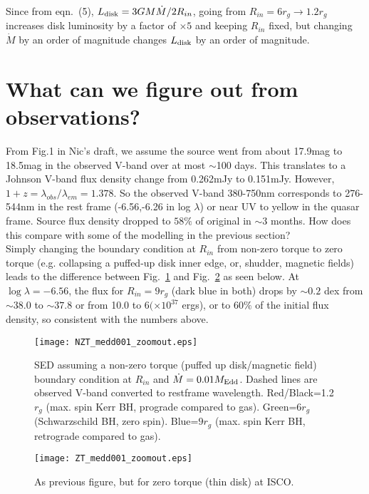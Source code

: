 \documentclass[12pt]{article}
\begin{document}
Since from eqn.~(5), $L_{\rm disk}=3GM\dot{M}/2R_{in}$, going from $R_{in}=6r_{g} \rightarrow 1.2r_{g}$ increases disk luminosity by a factor of $\times 5$ and keeping $R_{in}$ fixed, but changing  $\dot{M}$ by an order of magnitude changes $L_{\rm disk}$ by an order of magnitude.\\

\section{What can we figure out from observations?}
From Fig.1 in Nic's draft, we assume the source went from about 17.9mag to 18.5mag in the observed V-band over at most $\sim $100 days. This translates to a Johnson V-band flux density change from 0.262mJy to 0.151mJy. However, $1+z=\lambda_{obs}/\lambda_{em}=1.378$. So the observed V-band 380-750nm corresponds to 276-544nm in the rest frame (-6.56,-6.26 in log $\lambda$) or near UV to yellow in the quasar frame. Source flux density dropped to $58\%$ of original in $\sim 3$ months. How does this compare with some of the modelling in the previous section?\\

Simply changing the boundary condition at $R_{in}$ from non-zero torque to zero torque (e.g. collapsing a puffed-up disk inner edge, or, shudder, magnetic fields) leads to the difference between Fig.~\ref{fig:nzt} and Fig.~\ref{fig:zt} as seen below. At $\log \lambda= -6.56$, the flux for $R_{in}=9r_{g}$ (dark blue in both) drops by $\sim 0.2$ dex from $\sim 38.0$ to $\sim 37.8$ or from 10.0 to 6$(\times 10^{37}$ ergs), or to $60\%$ of the initial flux density, so consistent with the numbers above. \\

\begin{figure}
\begin{center}
\texttt{[image: NZT\_medd001\_zoomout.eps]}
\end{center}
\caption[cartoon]{
SED assuming a non-zero torque (puffed up disk/magnetic field) boundary condition at $R_{in}$ and $\dot{M}=0.01M_{\rm Edd}$. Dashed lines are observed V-band converted to restframe wavelength. Red/Black=1.2$r_{g}$ (max. spin Kerr BH, prograde compared to gas). Green=$6r_{g}$ (Schwarzschild BH, zero spin). Blue=$9r_{g}$ (max. spin Kerr BH, retrograde compared to gas).
\label{fig:nzt}}
\end{figure}

\begin{figure}
\begin{center}
\texttt{[image: ZT\_medd001\_zoomout.eps]}
\end{center}
\caption[cartoon]{
As previous figure, but for zero torque (thin disk) at ISCO.
\label{fig:zt}}
\end{figure}
\end{document}
